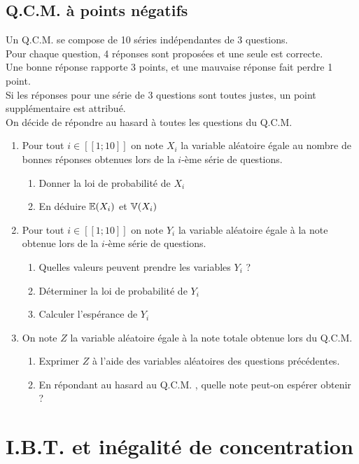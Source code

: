 \documentclass[oneside,12pt]{book}          %
\begin{document}
\subsection{Q.C.M. à points négatifs}
Un Q.C.M. se compose de 10 séries indépendantes de 3 questions.\\
Pour chaque question, 4 réponses sont proposées et une seule est correcte.\\
Une bonne réponse rapporte 3 points, et une mauvaise réponse fait perdre 1 point.\\
Si les réponses pour une série de 3 questions sont toutes justes, un point supplémentaire est attribué.\\
On décide de répondre au hasard à toutes les questions du Q.C.M.
\begin{enumerate}
    \item Pour tout $i\in[\![1;10]\!]$ on note $X_i$ la variable aléatoire égale au nombre de bonnes réponses obtenues lors de la $i$-ème série de questions.
    \begin{enumerate}
        \item Donner la loi de probabilité de $X_i$
        \item En déduire ${\mathbb E}(X_i)$ et ${\mathbb V}(X_i)$
    \end{enumerate}
    \item Pour tout $i\in[\![1;10]\!]$ on note $Y_i$ la variable aléatoire égale à la note obtenue lors de la $i$-ème série de questions.
    \begin{enumerate}
        \item Quelles valeurs peuvent prendre les variables $Y_i$ ?
        \item Déterminer la loi de probabilité de $Y_i$
        \item Calculer l'espérance de $Y_i$
    \end{enumerate}
    \item On note $Z$ la variable aléatoire égale à la note totale obtenue lors du Q.C.M.
    \begin{enumerate}
        \item Exprimer $Z$ à l'aide des variables aléatoires des questions précédentes.
        \item En répondant au hasard au Q.C.M. , quelle note peut-on espérer obtenir ?
    \end{enumerate}
\end{enumerate}



\section{I.B.T. et inégalité de concentration}
\end{document}
